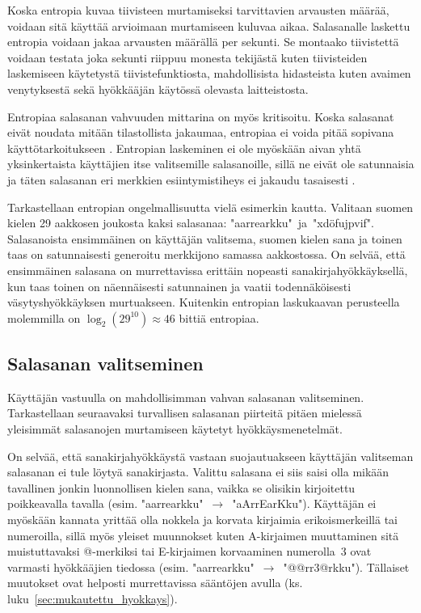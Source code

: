 Koska entropia kuvaa tiivisteen murtamiseksi tarvittavien arvausten määrää, voidaan sitä käyttää arvioimaan murtamiseen kuluvaa aikaa. Salasanalle laskettu entropia voidaan jakaa arvausten määrällä per sekunti. Se montaako tiivistettä voidaan testata joka sekunti riippuu monesta tekijästä kuten tiivisteiden laskemiseen käytetystä tiivistefunktiosta, mahdollisista hidasteista kuten avaimen venytyksestä sekä hyökkääjän käytössä olevasta laitteistosta.

Entropiaa salasanan vahvuuden mittarina on myös kritisoitu. Koska salasanat eivät noudata mitään tilastollista jakaumaa, entropiaa ei voida pitää sopivana käyttötarkoitukseen \citep{ma_password_2010}. Entropian laskeminen ei ole myöskään aivan yhtä yksinkertaista käyttäjien itse valitsemille salasanoille, sillä ne eivät ole satunnaisia ja täten salasanan eri merkkien esiintymistiheys ei jakaudu tasaisesti \citep[s. 105]{burr_electronic_2013}.

Tarkastellaan entropian ongelmallisuutta vielä esimerkin kautta. Valitaan suomen kielen 29 aakkosen joukosta kaksi salasanaa: "aarrearkku"~ja~"xdöfujpvif". Salasanoista ensimmäinen on käyttäjän valitsema, suomen kielen sana ja toinen taas on satunnaisesti generoitu merkkijono samassa aakkostossa. On selvää, että ensimmäinen salasana on murrettavissa erittäin nopeasti sanakirjahyökkäyksellä, kun taas toinen on näennäisesti satunnainen ja vaatii todennäköisesti väsytyshyökkäyksen murtuakseen. Kuitenkin entropian laskukaavan perusteella molemmilla on $\log_{2}(29^{10}) \approx 46$ bittiä entropiaa.

\subsection{Salasanan valitseminen\label{subsec:salasanan:valitseminen}}

Käyttäjän vastuulla on mahdollisimman vahvan salasanan valitseminen. Tarkastellaan seuraavaksi turvallisen salasanan piirteitä pitäen mielessä yleisimmät salasanojen murtamiseen käytetyt hyökkäysmenetelmät.

On selvää, että sanakirjahyökkäystä vastaan suojautuakseen käyttäjän valitseman salasanan ei tule löytyä sanakirjasta. Valittu salasana ei siis saisi olla mikään tavallinen jonkin luonnollisen kielen sana, vaikka se olisikin kirjoitettu poikkeavalla tavalla (esim. "aarrearkku"~$\rightarrow$~"aArrEarKku"). Käyttäjän ei myöskään kannata yrittää olla nokkela ja korvata kirjaimia erikoismerkeillä tai numeroilla, sillä myös yleiset muunnokset kuten A-kirjaimen muuttaminen sitä muistuttavaksi @-merkiksi tai E-kirjaimen korvaaminen numerolla~3 ovat varmasti hyökkääjien tiedossa (esim. "aarrearkku"~$\rightarrow$~"@@rr3@rkku"). Tällaiset muutokset ovat helposti murrettavissa sääntöjen avulla (ks. luku~\ref{sec:mukautettu_hyokkays}).

